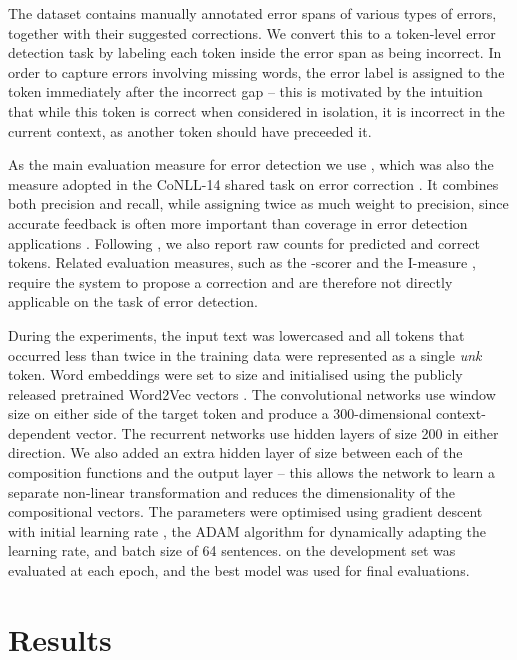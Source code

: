 \documentclass[11pt]{article}
\begin{document}
The dataset contains manually annotated error spans of various types of errors, together with their suggested corrections. We convert this to a token-level error detection task by labeling each token inside the error span as being incorrect. 
In order to capture errors involving missing words, the error label is assigned to the token immediately after the incorrect gap -- this is motivated by the intuition that while this token is correct when considered in isolation, it is incorrect in the current context, as another token should have preceeded it.

As the main evaluation measure for error detection we use , which was also the measure adopted in the CoNLL-14 shared task on error correction \cite{Ng2013a}. It combines both precision and recall, while assigning twice as much weight to precision, since accurate feedback is often more important than coverage in error detection applications \cite{Nagata2010}.
Following , we also report raw counts for predicted and correct tokens.
Related evaluation measures, such as the -scorer \cite{Ng2013a} and the I-measure \cite{Felice2015}, require the system to propose a correction and are therefore not directly applicable on the task of error detection.

During the experiments, the input text was lowercased and all tokens that occurred less than twice in the training data were represented as a single \textit{unk} token.
Word embeddings were set to size  and initialised using the publicly released pretrained Word2Vec vectors \cite{Mikolov2013a}.
The convolutional networks use window size  on either side of the target token and produce a 300-dimensional context-dependent vector.
The recurrent networks use hidden layers of size 200 in either direction.
We also added an extra hidden layer of size  between each of the composition functions and the output layer -- this allows the network to learn a separate non-linear transformation and reduces the dimensionality of the compositional vectors.
The parameters were optimised using gradient descent with initial learning rate , the {\small ADAM} algorithm \cite{Kingma2015} for dynamically adapting the learning rate, and batch size of 64 sentences.
 on the development set was evaluated at each epoch, and the best model was used for final evaluations.



\section{Results}
\end{document}
